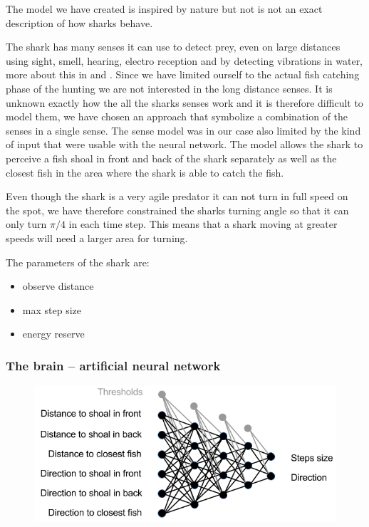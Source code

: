 The model we have created is inspired by nature but not is not an exact description of how sharks behave.

The shark has many senses it can use to detect prey, even on large distances using sight, smell, hearing, electro reception and by detecting vibrations in water, more about this in \cite{shark_vision} and \cite{shark_electric}. Since we have limited ourself to the actual fish catching phase of the hunting we are not interested in the long distance senses.  It is unknown exactly how the all the sharks senses work and it is therefore  difficult to model them, we have chosen an approach that symbolize a combination of the senses in a single sense. The sense model was in our case also limited by the kind of input that were usable with the neural network. The model allows the shark to perceive a fish shoal in front and back of the shark separately as well as the closest fish in the area where the shark is able to catch the fish.

Even though the shark is a very agile predator it can not turn in full speed on the spot, we have therefore constrained the sharks turning angle so that it can only turn $\pi/4$ in each time step. This means that a shark moving at greater speeds will need a larger area for turning.

The parameters of the shark are:
\begin{itemize}
\item observe distance
\item max step size
\item energy reserve
\end{itemize}

\subsubsection{The brain -- artificial neural network}

\begin{figure}
\centering
\includegraphics[width=.7\textwidth]{figs/ann_structure.png}
\caption{\label{fig:ann}}
\end{figure}

